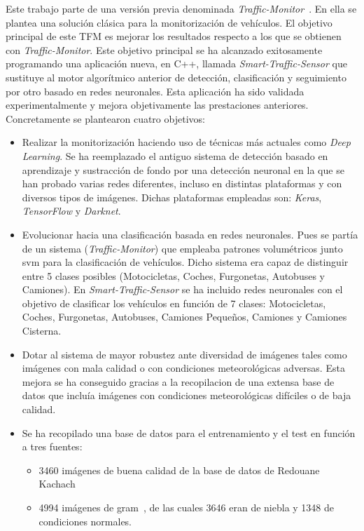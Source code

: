 Este trabajo parte de una versión previa denominada \textit{Traffic-Monitor}~\cite{traffic_monitor_redo}. En ella se plantea una solución clásica para la monitorización de vehículos. El objetivo principal de este TFM es mejorar los resultados respecto a los que se obtienen con \textit{Traffic-Monitor}. Este objetivo principal se ha alcanzado exitosamente programando una
aplicación nueva, en C++, llamada \textit{Smart-Traffic-Sensor} que sustituye al motor algorítmico anterior de detección, clasificación y seguimiento por otro basado en redes neuronales. Esta aplicación ha sido validada experimentalmente y mejora objetivamente las prestaciones anteriores. Concretamente se plantearon cuatro  objetivos:
\begin{itemize}
    \item Realizar la monitorización haciendo uso de técnicas más actuales como \textit{Deep Learning}. Se ha reemplazado el antiguo sistema de detección basado en aprendizaje y sustracción de fondo por una detección neuronal en la que se han probado varias redes diferentes, incluso en distintas plataformas y con diversos tipos de imágenes. Dichas plataformas empleadas son: \textit{Keras}, \textit{TensorFlow} y \textit{Darknet}.
    \item Evolucionar hacia una clasificación basada en redes neuronales. Pues se partía de un sistema (\textit{Traffic-Monitor}) que empleaba patrones volumétricos junto \acrshort{svm} para la clasificación de vehículos. Dicho sistema era capaz de distinguir entre 5 clases posibles (Motocicletas, Coches, Furgonetas, Autobuses y Camiones). En \textit{Smart-Traffic-Sensor} se ha incluido redes neuronales con el objetivo de clasificar los vehículos en función de 7 clases: Motocicletas, Coches, Furgonetas, Autobuses, Camiones Pequeños, Camiones y Camiones Cisterna.
    \item Dotar al sistema de mayor robustez ante diversidad de imágenes tales como imágenes con mala calidad o con condiciones meteorológicas adversas. Esta mejora se ha conseguido gracias a la recopilacion de una extensa base de datos que incluía imágenes con condiciones meteorológicas difíciles o de baja calidad.
    \item Se ha recopilado una base de datos para el entrenamiento y el test en función a tres fuentes: 
    \begin{itemize}
        \item 3460 imágenes de buena calidad de la base de datos de Redouane Kachach~\cite{traffic_monitor_lab}
        \item 4994 imágenes de \acrfull{gram}~\cite{guerrero2013iwinac}, de las cuales 3646 eran de niebla y  1348 de condiciones normales.

\end{itemize}
\end{itemize}
